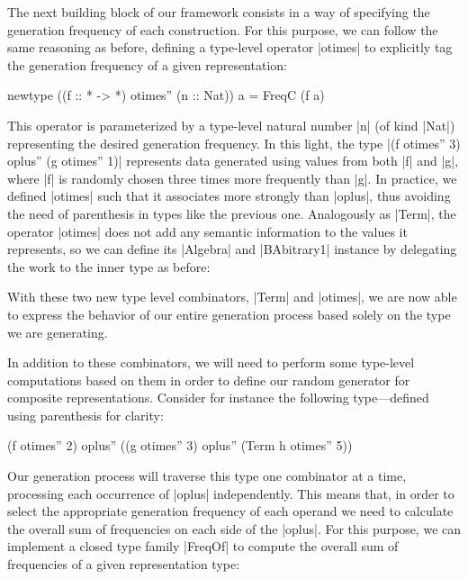 The next building block of our framework consists in a way of specifying the
generation frequency of each construction.
%
For this purpose, we can follow the same reasoning as before, defining a
type-level operator |otimes| to explicitly tag the generation frequency of a
given representation:

\begin{code}
newtype ((f :: * -> *) otimes'' (n :: Nat)) a = FreqC (f a)
\end{code}
%
This operator is parameterized by a type-level natural number |n| (of kind |Nat|)
representing the desired generation frequency.
%
In this light, the type |(f otimes'' 3) oplus'' (g otimes'' 1)| represents data
generated using values from both |f| and |g|, where |f| is randomly chosen three
times more frequently than |g|.
%
In practice, we defined |otimes| such that it associates more strongly than
|oplus|, thus avoiding the need of parenthesis in types like the previous one.
%
Analogously as |Term|, the operator |otimes| does not add any semantic
information to the values it represents, so we can define its |Algebra| and
|BAbitrary1| instance by delegating the work to the inner type as before:



With these two new type level combinators, |Term| and |otimes|, we are now able
to express the behavior of our entire generation process based solely on the
type we are generating.


In addition to these combinators, we will need to perform some type-level
computations based on them in order to define our random generator for composite
representations.
%
Consider for instance the following type---defined using parenthesis for clarity:

\begin{code}
(f otimes'' 2) oplus'' ((g otimes'' 3) oplus'' (Term h otimes'' 5))
\end{code}
%
Our generation process will traverse this type one combinator at a time,
processing each occurrence of |oplus| independently.
%
This means that, in order to select the appropriate generation frequency of each
operand we need to calculate the overall sum of frequencies on each side of the
|oplus|.
%
For this purpose, we can implement a closed type family |FreqOf| to compute the
overall sum of frequencies of a given representation type:

